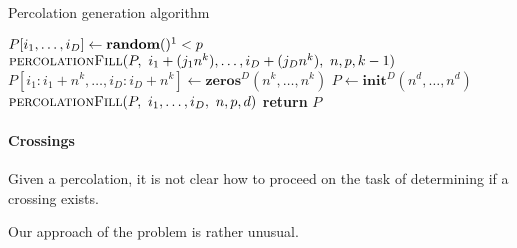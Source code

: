 \begin{algorithm}[!h]
	\caption{Percolation generation algorithm}\label{algo:percolationGeneration}
	\begin{algorithmic}[1]
		\State $P[i_1,\dots,i_D] \gets \textbf{random}()\footnotemark < p$ 
		\Else
		\State $\textsc{percolationFill}(P, \ i_1+(j_1 n^k),\dots,i_D+(j_D n^k), \ n, p, k-1)$ 
		\Else
		\State $P[i_1:i_1+n^k,\dots,i_D:i_D+n^k] \gets \textbf{zeros$^D$}(n^k,\dots,n^k)$ 
		\EndIf
		\EndFor
		\EndIf
		\EndProcedure
		\State $P \gets \textbf{init$^D$}(n^d,\dots,n^d)$
		\State $\textsc{percolationFill}(P, \ i_1,\dots,i_D, \ n, p, d)$ 
		\State \textbf{return} $P$
		\EndProcedure
	\end{algorithmic}
\end{algorithm}
\addtocounter{footnote}{-1}
\addtocounter{footnote}{-1}

\paragraph{Crossings}\label{crossingAlgorithm}
Given a percolation, it is not clear how to proceed on the task of determining if a crossing exists.

Our approach of the problem is rather unusual.

